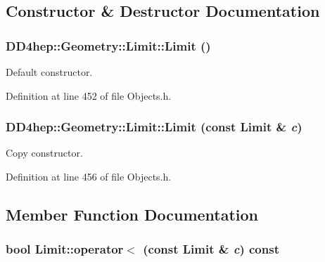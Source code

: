 \subsection{Constructor \& Destructor Documentation}
\hypertarget{class_d_d4hep_1_1_geometry_1_1_limit_af8c3f725caf1e3b50b86e2dbfefad3e1}{
\subsubsection[{Limit}]{\setlength{\rightskip}{0pt plus 5cm}DD4hep::Geometry::Limit::Limit ()}}
\label{class_d_d4hep_1_1_geometry_1_1_limit_af8c3f725caf1e3b50b86e2dbfefad3e1}


Default constructor. 

Definition at line 452 of file Objects.h.\hypertarget{class_d_d4hep_1_1_geometry_1_1_limit_a60ce84b00fb40254e489228e52db8aab}{
\subsubsection[{Limit}]{\setlength{\rightskip}{0pt plus 5cm}DD4hep::Geometry::Limit::Limit (const {\bf Limit} \& {\em c})}}
\label{class_d_d4hep_1_1_geometry_1_1_limit_a60ce84b00fb40254e489228e52db8aab}


Copy constructor. 

Definition at line 456 of file Objects.h.

\subsection{Member Function Documentation}
\hypertarget{class_d_d4hep_1_1_geometry_1_1_limit_a23ebb997ee827b26d0eb6f714d8fad94}{
\subsubsection[{operator$<$}]{\setlength{\rightskip}{0pt plus 5cm}bool Limit::operator$<$ (const {\bf Limit} \& {\em c}) const}}
\label{class_d_d4hep_1_1_geometry_1_1_limit_a23ebb997ee827b26d0eb6f714d8fad94}


